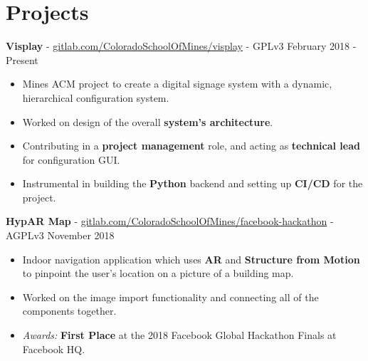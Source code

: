 \documentclass[10pt,letterpaper]{article}
\begin{document}
\section*{Projects}
\textbf{Visplay} -
\href{https://gitlab.com/ColoradoSchoolOfMines/visplay}{gitlab.com/ColoradoSchoolOfMines/visplay}
- GPLv3 \hfill February 2018 - Present
\begin{itemize}
    \item Mines ACM project to create a digital signage system with a dynamic,
        hierarchical configuration system.
    \item Worked on design of the overall \textbf{system's architecture}.
    \item Contributing in a \textbf{project management} role, and acting as
        \textbf{technical lead} for configuration GUI.
    \item Instrumental in building the \textbf{Python} backend and setting up
        \textbf{CI/CD} for the project.
\end{itemize}

\textbf{HypAR Map} -
\href{https://gitlab.com/ColoradoSchoolOfMines/facebook-hackathon}{gitlab.com/ColoradoSchoolOfMines/facebook-hackathon}
- AGPLv3 \hfill November 2018
\begin{itemize}
    \item Indoor navigation application which uses \textbf{AR} and
        \textbf{Structure from Motion} to pinpoint the user's location on a
        picture of a building map.
    \item Worked on the image import functionality and connecting all of the
        components together.
    \item \textit{Awards:} \textbf{First Place} at the 2018 Facebook Global
        Hackathon Finals at Facebook HQ.
\end{itemize}

\end{document}
